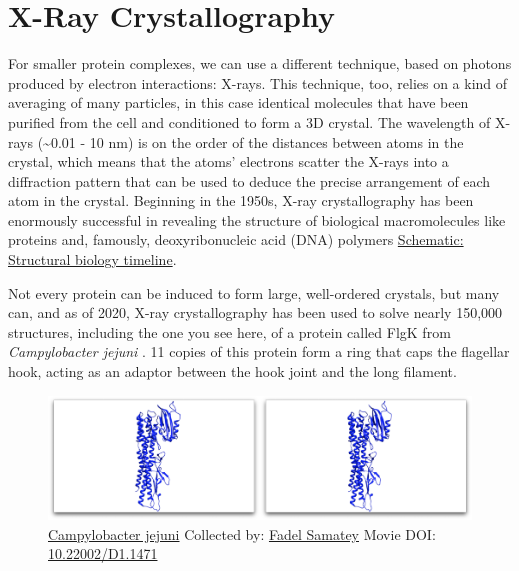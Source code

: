 \documentclass[]{tufte-book}
\begin{document}
\section{X-Ray Crystallography}\label{x-ray-crystallography}

For smaller protein complexes, we can use a different technique, based
on photons produced by electron interactions: X-rays. This technique,
too, relies on a kind of averaging of many particles, in this case
identical molecules that have been purified from the cell and
conditioned to form a 3D crystal. The wavelength of X-rays
(\textasciitilde{}0.01 - 10 nm) is on the order of the distances between
atoms in the crystal, which means that the atoms' electrons scatter the
X-rays into a diffraction pattern that can be used to deduce the precise
arrangement of each atom in the crystal. Beginning in the 1950s, X-ray
crystallography has been enormously successful in revealing the
structure of biological macromolecules like proteins and, famously,
deoxyribonucleic acid (DNA) polymers
\protect\hyperlink{Structural_biology_timeline}{Schematic: Structural
biology timeline}.

Not every protein can be induced to form large, well-ordered crystals,
but many can, and as of 2020, X-ray crystallography has been used to
solve nearly 150,000 structures, including the one you see here, of a
protein called FlgK from \emph{Campylobacter jejuni}
\citep{bulieris2017}. 11 copies of this protein form a ring that caps
the flagellar hook, acting as an adaptor between the hook joint and the
long filament.





\begin{figure}
\includegraphics{movie_stills/1_9} \caption[\protect\hyperlink{tree}{Campylobacter jejuni} Collected by:
\protect\hyperlink{fadel_samatey}{Fadel Samatey} Movie DOI:
\href{https://doi.org/10.22002/D1.1471}{10.22002/D1.1471}]{\protect\hyperlink{tree}{Campylobacter jejuni} Collected by:
\protect\hyperlink{fadel_samatey}{Fadel Samatey} Movie DOI:
\href{https://doi.org/10.22002/D1.1471}{10.22002/D1.1471}}\label{fig:1-9}
\end{figure}
\end{document}
